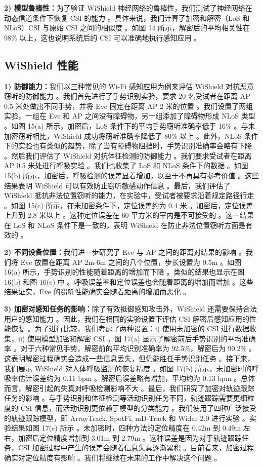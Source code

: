 \documentclass[journal]{IEEEtran}
\begin{document}
\textbf{2) 模型鲁棒性：}为了验证 WiShield 神经网络的鲁棒性，我们测试了神经网络在动态信道条件下恢复 CSI 的能力 。具体来说，我们计算了加密和解密（LoS 和 NLoS）CSI 与原始 CSI 之间的相似度 。如图 14 所示，解密后的平均相关性在 98\% 以上，这也说明系统后的 CSI 可以准确地执行感知应用 。

\subsection{WiShield 性能}
\textbf{1) 防御能力：}我们以三种常见的 Wi-Fi 感知应用为例来评估 WiShield 对抗恶意窃听的防御能力 。我们首先进行了手势识别实验，要求 20 名受试者在距离 AP 0.5 米处做出不同手势，并将 Eve 固定在距离 AP 2 米的位置 。我们设置了两组实验，一组在 Eve 和 AP 之间没有障碍物，另一组添加了障碍物形成 NLoS 类型 。如图 15(a) 所示，加密后，LoS 条件下的平均手势窃听准确率低于 16\% 。与未加密窃听相比，WiShield 成功将窃听准确率降低了 80\% 以上 。此外，NLoS 条件下的实验也有类似的趋势，除了当有障碍物阻挡时，手势识别准确率会略有下降 。然后我们评估了 WiShield 对抗体征检测的防御能力 。我们要求受试者在距离 AP 0.5 米处进行呼吸实验 。我们也收集了 LoS 和 NLoS 条件下的数据 。如图 15(b) 所示，加密后，呼吸检测的误差显着增加，以至于不再具有参考价值 。这些结果表明 WiShield 可以有效防止窃听敏感动作信息 。最后，我们评估了 WiShield 抵抗非法位置窃听的能力，在实验中，受试者被要求沿着规定路径行走 。如图 15(c) 所示，在未加密条件下，定位误差约为 0.4 米 。加密后，定位误差上升到 2.8 米以上 。这种定位误差在 60 平方米的室内是不可接受的 。这一结果在 LoS 和 NLoS 条件下是一致的，表明 WiShield 在防止非法位置窃听方面是有效的 。

\textbf{2) 不同设备位置：}我们进一步研究了 Eve 与 AP 之间的距离对结果的影响 。我们将 Eve 放置在距离 AP 2m-6m 之间的八个位置，步长设置为 0.5m 。如图 16(a) 所示，手势识别的性能随着距离的增加而下降 。类似的结果也显示在图 16(b) 和图 16(c) 中 。呼吸误差率和定位误差也会随着距离的增加而增加 。这些结果证实，Eve 的窃听性能确实会随着距离的增加而恶化 。

\textbf{3) 加密对感知任务的影响：}除了有效抵御感知攻击外，WiShield 还需要保持合法用户的感知能力 。因此，我们在相同的实验设置下评估 CSI 解密后感知应用的性能恢复 。为了进行比较，我们考虑了两种设置：i) 使用未加密的 CSI 进行数据收集，ii) 使用模型加密和解密 CSI 。图 17(a) 显示了解密前后手势识别的平均准确率 。对于六种常见手势，解密前的平均识别准确率为 92.5\%，解密后为 90.2\% 。这表明解密过程确实会造成一些信息丢失，但仍能胜任手势识别任务 。接下来，我们展示 WiShield 对人体呼吸监测的恢复精度 。如图 17(b) 所示，未加密时的呼吸率估计误差约为 0.11 bpm 。解密后误差略有增加，平均约为 0.13 bpm 。总体而言，解密引起的失真对呼吸检测影响不大 。最后，我们研究了加密对轨迹跟踪任务的影响 。与手势识别和体征检测等活动识别任务不同，轨迹跟踪需要更细粒度的 CSI 信息，而活动识别更依赖于模型的分类能力 。我们使用了四种广泛接受的轨迹跟踪模型，即 ArrayTrack, SpotFi, mD-Track 和 Widar 2.0 进行实验 。实验结果如图 17(c) 所示 。未加密时，四种方法的定位精度在 0.42m 到 0.49m 左右，加密后定位精度增加到 3.01m 到 2.79m 。这种误差是因为对于轨迹跟踪任务，CSI 加密过程中产生的误差会随着信息失真逐渐累积 。目前看来，加密过程确实对定位精度有影响 。我们将继续在未来的工作中解决这个问题 。
\end{document}
